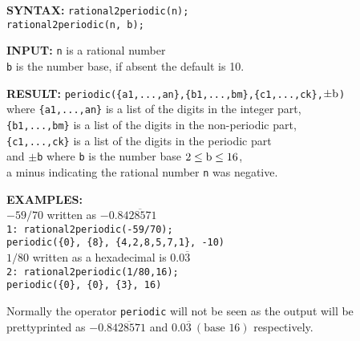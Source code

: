 \begin{list}{}{
    \setlength{\leftmargin}{22mm}
    \setlength{\labelwidth}{\leftmargin}\addtolength{\labelwidth}{-\labelsep}
    \renewcommand{\makelabel}[1]{#1}
  }
\item[\textbf{SYNTAX:}]
  \texttt{rational2periodic(n);}\\
  {\tt rational2periodic(n, b);}

\item[\textbf{INPUT:}]
  \texttt{n} \hspace{3mm} is a rational number\\
  {\tt b} \hspace{3mm} is the number base, if absent the default is 10.

\item[\textbf{RESULT:}]
  {\tt periodic(\{a1,...,an\},\{b1,...,bm\},\{c1,...,ck\},$\pm{\rm b}$)}\\
  where  {\tt\{a1,...,an\}} is a list of the digits in the integer part,\\
  {\tt\{b1,...,bm\}} is a list of the digits in the non-periodic part,\\
  {\tt\{c1,...,ck\}} is a list of the digits in the periodic part\\
  and $\pm${\tt b} where {\tt b} is the number base $2 \leq {\rm b} \leq 16$, \\
  a minus indicating the rational number {\tt n} was negative.

\item[\textbf{EXAMPLES:}]\mbox{}\\
  $-59/70$ written as $-0.8\overline{428571}$\\
  \texttt{1: rational2periodic(-59/70);}\\
  \texttt{\hspace*{1em}periodic(\{0\}, \{8\}, \{4,2,8,5,7,1\}, -10)}\\[\baselineskip]
  $1/80$ written as a hexadecimal is $0.0\overline{3}$\\
  \texttt{2: rational2periodic(1/80,16);}\\
  \texttt{\hspace*{1em}periodic(\{0\}, \{0\}, \{3\}, 16)}
\end{list}

Normally the operator {\tt periodic} will not be seen as the output
will be prettyprinted as $-0.8\overline{428571}$ and
$0.0\overline{3}\ (\mbox{base }16)$ respectively.

